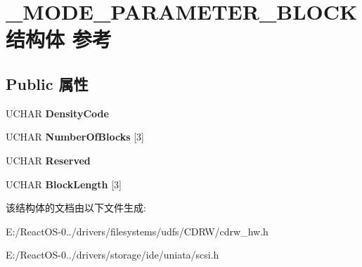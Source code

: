 \hypertarget{struct___m_o_d_e___p_a_r_a_m_e_t_e_r___b_l_o_c_k}{}\section{\+\_\+\+M\+O\+D\+E\+\_\+\+P\+A\+R\+A\+M\+E\+T\+E\+R\+\_\+\+B\+L\+O\+C\+K结构体 参考}
\label{struct___m_o_d_e___p_a_r_a_m_e_t_e_r___b_l_o_c_k}
\subsection*{Public 属性}
\begin{DoxyCompactItemize}
\item 
\mbox{\label{struct___m_o_d_e___p_a_r_a_m_e_t_e_r___b_l_o_c_k_a414423ff8085e535627c15e4d4dec0bb}} 
U\+C\+H\+AR {\bfseries Density\+Code}
\item 
\mbox{\label{struct___m_o_d_e___p_a_r_a_m_e_t_e_r___b_l_o_c_k_aff96d3bcb9a6aa08da8f2cd3b9f6c4cb}} 
U\+C\+H\+AR {\bfseries Number\+Of\+Blocks} \mbox{[}3\mbox{]}
\item 
\mbox{\label{struct___m_o_d_e___p_a_r_a_m_e_t_e_r___b_l_o_c_k_a92d5c0e4f607188ed78590ba900fb2fa}} 
U\+C\+H\+AR {\bfseries Reserved}
\item 
\mbox{\label{struct___m_o_d_e___p_a_r_a_m_e_t_e_r___b_l_o_c_k_ae9568a64970dedfa784e025b7cbcb62c}} 
U\+C\+H\+AR {\bfseries Block\+Length} \mbox{[}3\mbox{]}
\end{DoxyCompactItemize}


该结构体的文档由以下文件生成\+:\begin{DoxyCompactItemize}
\item 
E\+:/\+React\+O\+S-\/0../drivers/filesystems/udfs/\+C\+D\+R\+W/cdrw\+\_\+hw.\+h\item 
E\+:/\+React\+O\+S-\/0../drivers/storage/ide/uniata/scsi.\+h\end{DoxyCompactItemize}
